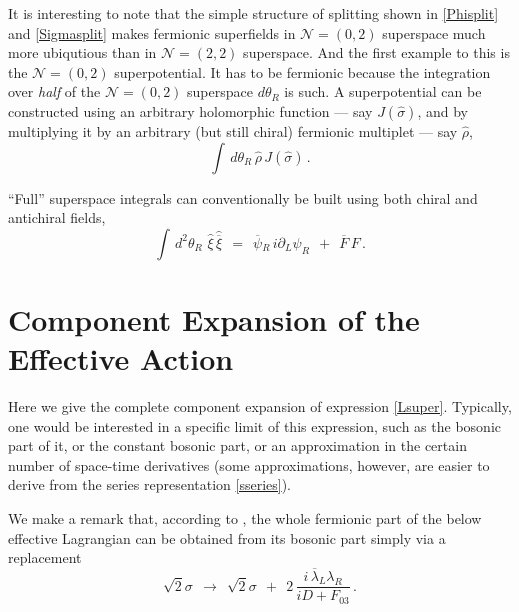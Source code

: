 \documentclass[epsfig,12pt]{article}
\def\beq{\begin{equation}}
\def\eeq{\end{equation}}
\newcommand{\ntwot}{${\mathcal N}= \left(2,2\right) $ }
\newcommand{\ntwoo}{${\mathcal N}= \left(0,2\right) $ }
\newcommand{\p}{\partial}
\newcommand{\ov}{\overline}
\newcommand{\hxi}{\hat\xi{}}
\newcommand{\hbxi}{\hat{\ov\xi}{}}
\newcommand{\hsigma}{\hat\sigma{}}
\begin{document}
	
	It is interesting to note that the simple structure of splitting shown in \eqref{Phisplit} and \eqref{Sigmasplit}
	makes fermionic superfields in \ntwoo superspace much more ubiqutious than in \ntwot superspace.
	And the first example to this is the \ntwoo superpotential.
	It has to be fermionic because the integration over {\it half} of the \ntwoo superspace $ d\theta_R $ is such.
	A superpotential can be constructed using an arbitrary holomorphic function --- say $ J(\hsigma) $, and
	by multiplying it by an arbitrary (but still chiral) fermionic multiplet --- say $ \hat{\rho} $,
\beq
	\int\, d\theta_R\, \hat{\rho}\, J(\hsigma)\,.
\eeq

	``Full'' superspace integrals can conventionally be built using both chiral and antichiral fields,
\beq
	\int\, d^2\theta_R\,\, \hxi\, \hbxi    ~~=~~    \ov\psi{}_R\,i\p_L \psi_R  ~~+~~  \ov F\,F\,.
\eeq



\section{Component Expansion of the Effective Action}
\label{app:expansion}

	Here we give the complete component expansion of expression \eqref{Lsuper}. 
	Typically, one would be interested in a specific limit of this expression,
	such as the bosonic part of it, or the constant bosonic part, or 
	an approximation in the certain number of space-time derivatives
	(some approximations, however, are easier to derive from 
	the series representation \eqref{sseries}).

	We make a remark that, according to \cite{1p}, the whole fermionic part of
	the below effective Lagrangian can be obtained from its bosonic part simply
	via a replacement
\beq
	\sqrt{2}\sigma    ~~\longrightarrow~~    \sqrt{2}\sigma  ~~+~~  2\, \frac{i\,\ov\lambda{}_L\lambda_R}{iD + F_{03}}\,.
\eeq
\end{document}
